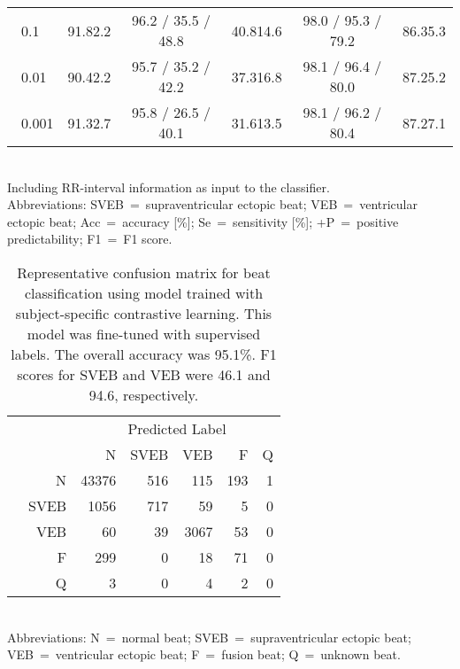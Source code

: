 \documentclass{article}
\newcommand{\std}[1]{{\scriptsize{#1}}}
\begin{document}
\begin{table}[H]
\begin{tabular}{lccccc}
\hspace{15pt}~0.1
    & 91.8\std{2.2}
    & 96.2 / 35.5 / 48.8 & 40.8\std{14.6}
    & 98.0 / 95.3 / 79.2 & 86.3\std{5.3} \\

\hspace{15pt}~0.01
    & 90.4\std{2.2}
    & 95.7 / 35.2 / 42.2 & 37.3\std{16.8}
    & 98.1 / 96.4 / 80.0 & 87.2\std{5.2} \\



\hspace{15pt}~0.001
    & 91.3\std{2.7}
    & 95.8 / 26.5 / 40.1 & 31.6\std{13.5}
    & 98.1 / 96.2 / 80.4 & 87.2\std{7.1} \\

    \bottomrule
  \end{tabular}\\
  \footnotesize{Including RR-interval information as input to the
  classifier.\\
  Abbreviations: SVEB~=~supraventricular ectopic beat; VEB~=~ventricular ectopic
  beat; Acc~=~accuracy [\%]; Se~=~sensitivity [\%]; +P~=~positive
  predictability; F1~=~F1 score.}
\end{table} 
\begin{table}[H]
  \caption{Representative confusion matrix for beat classification using model
  trained with subject-specific contrastive learning. This model was fine-tuned
  with supervised labels. The overall accuracy was 95.1\%. F1 scores for SVEB
  and VEB were 46.1 and 94.6, respectively.}
  \label{table:ecg:confusion}
  \centering
\begin{tabular}{rr|rrrrr}
    \toprule
    & & \multicolumn{5}{c}{Predicted Label} \\
    & &     N & SVEB &  VEB &   F & Q \\
    \hline
    \parbox[t]{2mm}{}
    &    N & 43376 &  516 &  115 & 193 & 1 \\
    & SVEB &  1056 &  717 &   59 &   5 & 0 \\
    &  VEB &    60 &   39 & 3067 &  53 & 0 \\
    &    F &   299 &    0 &   18 &  71 & 0 \\
    &    Q &     3 &    0 &    4 &   2 & 0 \\
    \bottomrule
  \end{tabular}\\
  \footnotesize{Abbreviations: N~=~normal beat; SVEB~=~supraventricular ectopic beat; VEB~=~ventricular ectopic beat; F~=~fusion beat; Q~=~unknown beat.}
\end{table} 
\end{document}
